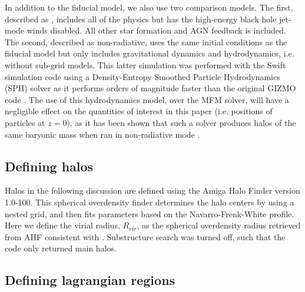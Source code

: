 In addition to the fiducial model, we also use two comparison models. The first, described as \nojet{}, includes all of the \simba{} physics but has the high-energy black hole jet-mode winds disabled.  All other star formation and AGN feedback is included.  The second, described as non-radiative, uses the same initial conditions as the fiducial model but only
includes gravitational dynamics and hydrodynamics, i.e. without sub-grid
models. This latter simulation was performed with the {\sc Swift} simulation
code \citep{Schaller2016} using a Density-Entropy Smoothed Particle
Hydrodynamics (SPH) solver as it performs orders of magnitude faster than the
original GIZMO code \citep{Borrow2018}. The use of this hydrodynamics model,
over the MFM solver, will have a negligible effect on the quantities of
interest in this paper (i.e. positions of particles at $z=0$), as it has been
shown that such a solver produces halos of the same baryonic mass when ran in
non-radiative mode \citep[see e.g.][]{Sembolini2016}.


\subsection{Defining halos}

Halos in the following discussion are defined using the Amiga Halo Finder
\citep[AHF, ][]{Gill2004, Knollmann2009} version 1.0-100. This spherical
overdensity finder determines the halo centers by using a nested grid, and
then fits parameters based on the Navarro-Frenk-White \citep[NFW,
][]{Navarro1995} profile. Here we define the virial radius, $R_{vir}$, as the
spherical overdensity radius retrieved from AHF consistent with
\citet{Lacey1994}. Substructure search was turned off, such that the code
only returned main halos.

\subsection{Defining lagrangian regions}

